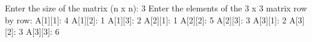Enter the size of the matrix (n x n): 3
Enter the elements of the 3 x 3 matrix row by row:
A[1][1]: 4
A[1][2]: 1
A[1][3]: 2
A[2][1]: 1
A[2][2]: 5
A[2][3]: 3
A[3][1]: 2
A[3][2]: 3
A[3][3]: 6

